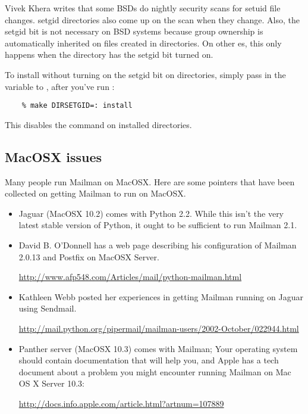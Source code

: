 \documentclass{howto}
\begin{document}
Vivek Khera writes that some BSDs do nightly security scans for setuid file
changes.  setgid directories also come up on the scan when they change.  Also,
the setgid bit is not necessary on BSD systems because group ownership is
automatically inherited on files created in directories.  On other \UNIX{}es,
this only happens when the directory has the setgid bit turned on.

To install without turning on the setgid bit on directories, simply pass in
the  variable to , after you've run
:

\begin{verbatim}
    % make DIRSETGID=: install
\end{verbatim}

This disables the  command on installed directories.

\subsection{MacOSX issues}

Many people run Mailman on MacOSX.  Here are some pointers that have been
collected on getting Mailman to run on MacOSX.

\begin{itemize}
\item Jaguar (MacOSX 10.2) comes with Python 2.2.  While this isn't the very
      latest stable version of Python, it ought to be sufficient to run
      Mailman 2.1.

\item David B. O'Donnell has a web page describing his configuration of
      Mailman 2.0.13 and Postfix on MacOSX Server.

      \url{http://www.afp548.com/Articles/mail/python-mailman.html}

\item Kathleen Webb posted her experiences in getting Mailman running on
      Jaguar using Sendmail.

      \url{http://mail.python.org/pipermail/mailman-users/2002-October/022944.html}

\item Panther server (MacOSX 10.3) comes with Mailman; Your operating system
      should contain documentation that will help you, and Apple has a tech
      document about a problem you might encounter running Mailman on Mac OS X
      Server 10.3:

      \url{http://docs.info.apple.com/article.html?artnum=107889}
\end{itemize}
\end{document}

